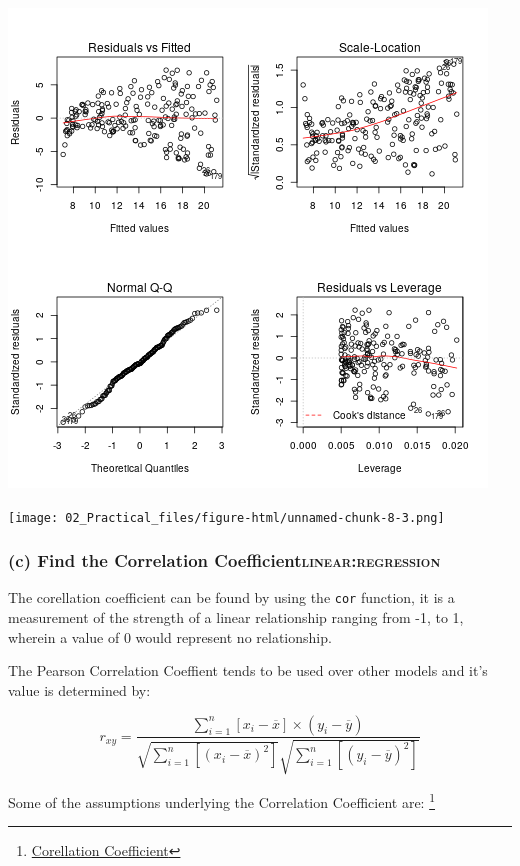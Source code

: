 \documentclass[11pt]{article}
\begin{document}
\begin{enumerate}
\begin{center}
\includegraphics[width=.9\linewidth]{Intro02AdvPlotLinMod.png}
\end{center}

\begin{center}
\texttt{[image: 02\_Practical\_files/figure-html/unnamed-chunk-8-3.png]}
\end{center}
\end{enumerate}
\subsubsection{(c) Find the Correlation Coefficient\hfill{}\textsc{linear:regression}}
\label{sec:org1c2b8d6}
The corellation coefficient can be found by using the \texttt{cor} function, it
is a measurement of the strength of a linear relationship ranging from
-1, to 1, wherein a value of 0 would represent no relationship.

The Pearson Correlation Coeffient tends to be used over other models and
it's value is determined by:

$$
   r_{xy} = \frac{\sum^{n}_{i= 1}   \left[ x_i - \overline{x} \right] \times \left( y_i - \overline{y} \right)}{\sqrt{\sum^{n}_{i= 1}   \left[\left(  x_i - \overline{x} \right)^2 \right]} \sqrt{\sum^{n}_{i= 1}   \left[ \left( y_i- \overline{y} \right)^2 \right]}}
  $$

Some of the assumptions underlying the Correlation Coefficient
are: \footnote{\href{spss-tutorials.com/pearson-correlation-coefficient/}{Corellation
Coefficient}}
\end{document}
